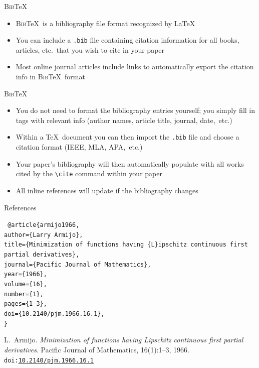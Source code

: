 \documentclass{beamer} %
\begin{document}
\begin{frame}{\textsc{Bib}\TeX}

\begin{itemize}
	\item \textsc{Bib}\TeX\ is a bibliography file format recognized by \LaTeX
	\item You can include a \texttt{.bib} file containing citation information for all books, articles, etc.~that you wish to cite in your paper
	\item Most online journal articles include links to automatically export the citation info in \textsc{Bib}\TeX\ format
\end{itemize}

\end{frame}

\begin{frame}{\textsc{Bib}\TeX}

\begin{itemize}
	\item You do not need to format the bibliography entries yourself; you simply fill in tags with relevant info (author names, article title, journal, date,~etc.)
	\item Within a \TeX\ document you can then import the \texttt{.bib} file and choose a citation format (IEEE, MLA, APA,~etc.)
	\item Your paper's bibliography will then automatically populate with all works cited by the \texttt{\textbackslash cite} command within your paper
	\item All inline references will update if the bibliography changes
\end{itemize}

\end{frame}

\begin{frame}{References}

{\tt \small
@article\{armijo1966,\\
author=\{Larry Armijo\},\\
title=\{Minimization of functions having \{L\}ipschitz continuous first partial derivatives\},\\
journal=\{Pacific Journal of Mathematics\},\\
year=\{1966\},\\
volume=\{16\},\\
number=\{1\},\\
pages=\{1--3\},\\
doi=\{10.2140/pjm.1966.16.1\},\\
\}
}

\vfill

L.~Armijo. \textit{Minimization of functions having Lipschitz continuous first partial derivatives}. Pacific Journal of Mathematics, 16(1):1--3, 1966. \texttt{doi:\href{https://doi.org/10.2140/pjm.1966.16.1}{10.2140/pjm.1966.16.1}}

\end{frame}
\end{document}
